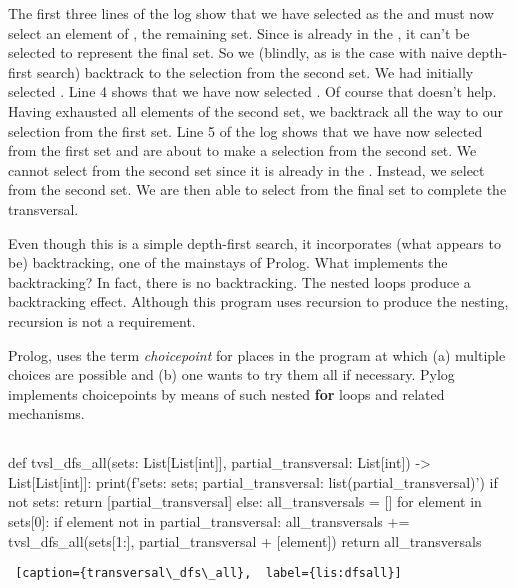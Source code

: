 The first three lines of the log show that we have selected \textittt{[1, 2]} as the  and must now select an element of \textittt{[1]}, the remaining set. Since  is already in the , it can't be selected to represent the final set. So we (blindly, as is the case with naive depth-first search) backtrack to the selection from the second set. We had initially selected . Line 4 shows that we have now selected . Of course that doesn't help. Having exhausted all elements of the second set, we backtrack all the way to our selection from the first set. Line 5 of the log shows that we have now selected  from the first set and are about to make a selection from the second set. We cannot select  from the second set since it is already in the . Instead, we select  from the second set. We are then able to select  from the final set to complete the transversal. 

Even though this is a simple depth-first search, it incorporates (what appears to be) backtracking, one of the mainstays of Prolog. What implements the backtracking? In fact, there is no backtracking. The nested  loops produce a backtracking effect. Although this program uses recursion to produce the nesting, recursion is not a requirement. 

Prolog, uses the term \textit{choicepoint} for places in the program at which (a) multiple choices are possible and (b) one wants to try them all if necessary. Pylog implements choicepoints by means of such nested \textbf{for} loops and related mechanisms.

\subsection{}


\begin{minipage}{\linewidth} \largev   \hrulefill
\begin{python}[numbers=left]
def tvsl_dfs_all(sets: List[List[int]], partial_transversal: List[int]) -> List[List[int]]:
  print(f'sets: {sets}; partial_transversal: {list(partial_transversal)}')
  if not sets:
    return [partial_transversal]
  else:
    all_transversals = []
    for element in sets[0]:
      if element not in partial_transversal:
        all_transversals += tvsl_dfs_all(sets[1:], partial_transversal + [element])
    return all_transversals
\end{python}
\begin{lstlisting} [caption={transversal\_dfs\_all},  label={lis:dfsall}]
\end{lstlisting}
\end{minipage}

